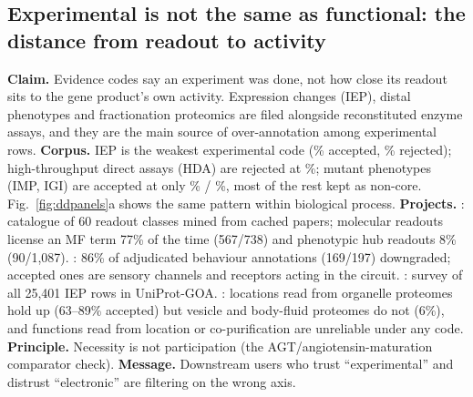 \subsection{Experimental is not the same as functional: the distance from readout to activity}\label{sec:dd-assay}
\textbf{Claim.} Evidence codes say an experiment was done, not how close its readout sits to the
gene product's own activity. Expression changes (IEP), distal phenotypes and fractionation proteomics
are filed alongside reconstituted enzyme assays, and they are the main source of over-annotation
among experimental rows.
\textbf{Corpus.} IEP is the weakest experimental code (\accIEP\% accepted, \rejIEP\% rejected);
high-throughput direct assays (HDA) are rejected at \rejHDA\%; mutant phenotypes (IMP, IGI) are
accepted at only \accIMP\% / \accIGI\%, most of the rest kept as non-core.
Fig.~\ref{fig:ddpanels}a shows the same pattern within biological process.
\textbf{Projects.} : catalogue of 60 readout classes mined from cached
papers; molecular readouts license an MF term 77\% of the time (567/738) and phenotypic hub
readouts 8\% (90/1,087). : 86\% of adjudicated behaviour annotations (169/197)
downgraded; accepted ones are sensory channels and receptors acting in the circuit.
: survey of all 25,401 IEP rows in UniProt-GOA. : locations
read from organelle proteomes hold up (63--89\% accepted) but vesicle and body-fluid proteomes do not
(6\%), and functions read from location or co-purification are unreliable under any code.
\textbf{Principle.} Necessity is not participation (the AGT/angiotensin-maturation comparator check).
\textbf{Message.} Downstream users who trust ``experimental'' and distrust ``electronic'' are
filtering on the wrong axis.

